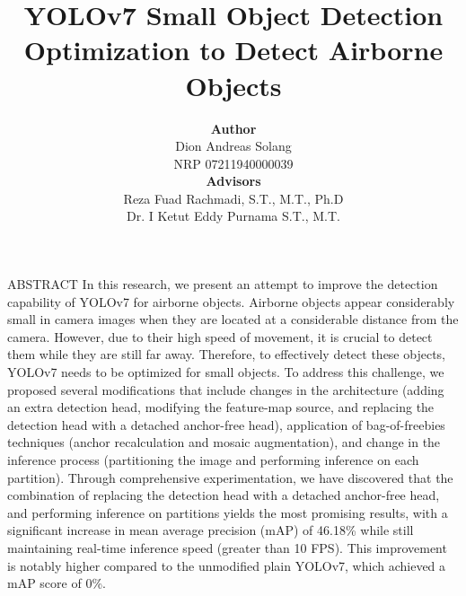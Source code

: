 \documentclass[final,hyperref={pdfpagelabels=false}]{beamer}
\title{\huge YOLOv7 Small Object Detection Optimization to Detect Airborne Objects} %
\author[Dion Solang]{ 
  \parbox[t]{7cm}{
    \textbf{Author}\\
    Dion Andreas Solang\\
    NRP 07211940000039
  }
  \parbox[t]{7cm}{
    \textbf{Advisors}\\
    Reza Fuad Rachmadi, S.T., M.T., Ph.D\\
    Dr. I Ketut Eddy Purnama S.T., M.T.
  }
} %
\institute{
  Department of Computer Engineering\\
  Institut Teknologi Sepuluh Nopember} %
\begin{document}

\begin{frame}[t] %

\begin{block}{ABSTRACT}
  In this research, we present an attempt to improve the detection capability of YOLOv7 for airborne objects. 
  Airborne objects appear considerably small in camera images when they are located at a considerable distance from the camera. 
  However, due to their high speed of movement, it is crucial to detect them while they are still far away. 
  Therefore, to effectively detect these objects, YOLOv7 needs to be optimized for small objects.
  To address this challenge, we proposed several modifications that include changes in the architecture (adding an extra detection head, modifying the feature-map source, and replacing the detection head with a detached anchor-free head), application of bag-of-freebies techniques (anchor recalculation and mosaic augmentation), and change in the inference process (partitioning the image and performing inference on each partition).
  Through comprehensive experimentation, we have discovered that the combination of replacing the detection head with a detached anchor-free head, and performing inference on partitions yields the most promising results, with a significant increase in mean average precision (mAP) of 46.18\% while still maintaining real-time inference speed (greater than 10 FPS).
  This improvement is notably higher compared to the unmodified plain YOLOv7, which achieved a mAP score of 0\%.
\end{block}


\end{frame}
\end{document}
